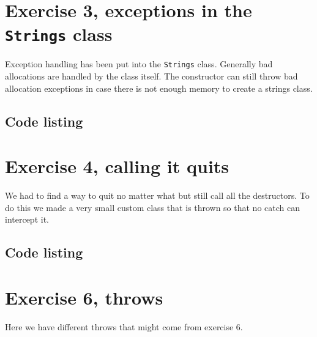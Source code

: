 \documentclass[11pt]{article}
\begin{document}
\section*{Exercise 3, exceptions in the \texttt{Strings} class}
Exception handling has been put into the \texttt{Strings} class.
Generally bad allocations are handled by the class itself.
The constructor can still throw bad allocation exceptions in case there is not enough memory to create a strings class.

\subsection*{Code listing}












\section*{Exercise 4, calling it quits}
We had to find a way to quit no matter what but still call all the destructors.
To do this we made a very small custom class that is thrown so that no catch can intercept it.

\subsection*{Code listing}


\section*{Exercise 6, throws}
Here we have different throws that might come from exercise 6.
\end{document}
